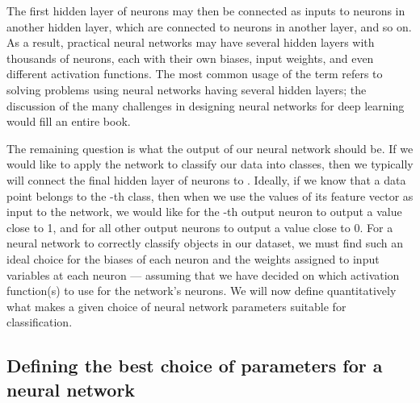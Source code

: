 The first hidden layer of neurons may then be connected as inputs to neurons in another hidden layer, which are connected to neurons in another layer, and so on. As a result, practical neural networks may have several hidden layers with thousands of neurons, each with their own biases, input weights, and even different activation functions. The most common usage of the term  refers to solving problems using neural networks having several hidden layers; the discussion of the many challenges in designing neural networks for deep learning would fill an entire book.\\

\begin{qbox}\end{qbox}

The remaining question is what the output of our neural network should be. If we would like to apply the network to classify our data into  classes, then we typically will connect the final hidden layer of neurons to  . Ideally, if we know that a data point  belongs to the -th class, then when we use the values of its feature vector as input to the network, we would like for the -th output neuron to output a value close to 1, and for all other output neurons to output a value close to 0. For a neural network to correctly classify objects in our dataset, we must find such an ideal choice for the biases of each neuron and the weights assigned to input variables at each neuron --- assuming that we have decided on which activation function(s) to use for the network's neurons. We will now define quantitatively what makes a given choice of neural network parameters suitable for classification.\\

\subsection{Defining the best choice of parameters for a neural network}

